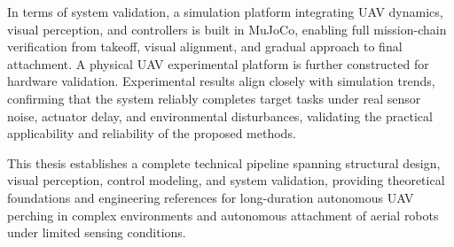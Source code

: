 \begin{abstract*}
In terms of system validation, a simulation platform integrating UAV dynamics, visual perception, and controllers is built in MuJoCo, enabling full mission-chain verification from takeoff, visual alignment, and gradual approach to final attachment. A physical UAV experimental platform is further constructed for hardware validation. Experimental results align closely with simulation trends, confirming that the system reliably completes target tasks under real sensor noise, actuator delay, and environmental disturbances, validating the practical applicability and reliability of the proposed methods.

This thesis establishes a complete technical pipeline spanning structural design, visual perception, control modeling, and system validation, providing theoretical foundations and engineering references for long-duration autonomous UAV perching in complex environments and autonomous attachment of aerial robots under limited sensing conditions.

\end{abstract*}
